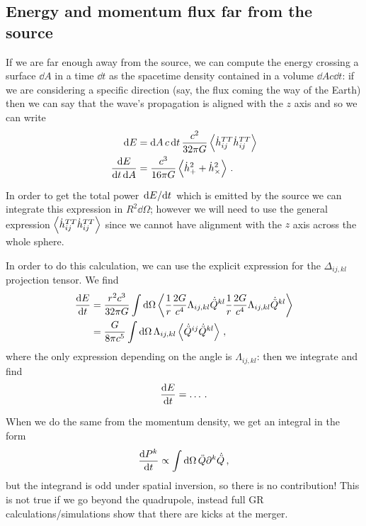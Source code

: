 \documentclass[main.tex]{subfiles}
\begin{document}
\subsection{Energy and momentum flux far from the source}

If we are far enough away from the source, we can compute the energy crossing a surface \(\dd{A}\) in a time \(\dd{t}\) as the spacetime density contained in a volume \(\dd{A} c \dd{t}\): if we are considering a specific direction (say, the flux coming the way of the Earth) then we can say that the wave's propagation is aligned with the \(z\) axis and so we can write 
%
\begin{align}
\dd{E} &= \dd{A} c \dd{t} \frac{c^2}{32 \pi G} \expval{\dot{h}^{TT}_{ij}\dot{h}^{TT}_{ij}} \\
\frac{ \dd{E}}{ \dd{t} \dd{A}} &= \frac{c^3}{16 \pi G} \expval{\dot{h}^2_{+} + \dot{h}^2_{ \times }}
\,.
\end{align}

In order to get the total power \(\dv*{E}{t}\) which is emitted by the source we can integrate this expression in \(R^2 \dd{\Omega }\); however we will need to use the general expression \(\expval{\dot{h}^{TT}_{ij}\dot{h}^{TT}_{ij}}\) since we cannot have alignment with the \(z\) axis across the whole sphere. 

In order to do this calculation, we can use the explicit expression for the \(\Delta_{ij,kl}\) projection tensor. We find 
%
\begin{subequations}
\begin{align}
\dv{E}{t} &= \frac{r^2c^{3}}{32 \pi G} \int \dd{\Omega }
\expval{
\frac{1}{r} \frac{2G}{c^{4}} \Lambda_{ij,kl} \dot{\ddot{Q}}^{kl}
\frac{1}{r} \frac{2G}{c^{4}} \Lambda_{ij,kl} \dot{\ddot{Q}}^{kl}
}  \\
&=\frac{G}{8 \pi c^{5}} \int \dd{\Omega }
\Lambda_{ij, kl} \expval{\dot{\ddot{Q}}^{ij} \dot{\ddot{Q}}^{kl}}
\,,
\end{align}
\end{subequations}
%
where the only expression depending on the angle is \(\Lambda_{ij, kl} \): then we integrate and find 
%
\begin{align}
\dv{E}{t} = \dots
\,.
\end{align}

When we do the same from the momentum density, we get an integral in the form 
%
\begin{align}
\dv{P^{k}}{t} \propto \int \dd{\Omega } \ddot{Q} \partial^{k} \dot{\ddot{Q}}
\,,
\end{align}
%
but the integrand is odd under spatial inversion, so there is no contribution! This is not true if we go beyond the quadrupole, instead full GR calculations/simulations show that there are kicks at the merger. 
\end{document}
